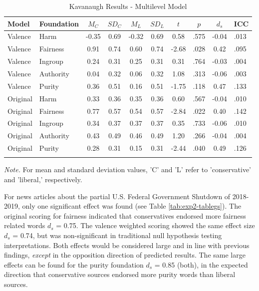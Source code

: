 \documentclass[
  man,floatsintext]{apa6}
\begin{document}
\begin{table}[ht]

\begin{center}
\begin{threeparttable}

\caption{\label{tab:exp2-tablekav}Kavanaugh Results - Multilevel Model}

\footnotesize{

\begin{tabular}{llcccccccl}
\toprule
Model & Foundation & $M_C$ & $SD_C$ & $M_L$ & $SD_L$ & $t$ & $p$ & $d_s$ & ICC\\
\midrule
Valence & Harm & -0.35 & 0.69 & -0.32 & 0.69 & 0.58 & .575 & -0.04 & .013\\
Valence & Fairness & 0.91 & 0.74 & 0.60 & 0.74 & -2.68 & .028 & 0.42 & .095\\
Valence & Ingroup & 0.24 & 0.31 & 0.25 & 0.31 & 0.31 & .764 & -0.03 & .004\\
Valence & Authority & 0.04 & 0.32 & 0.06 & 0.32 & 1.08 & .313 & -0.06 & .003\\
Valence & Purity & 0.36 & 0.51 & 0.16 & 0.51 & -1.75 & .118 & 0.47 & .133\\
Original & Harm & 0.33 & 0.36 & 0.35 & 0.36 & 0.60 & .567 & -0.04 & .010\\
Original & Fairness & 0.77 & 0.57 & 0.54 & 0.57 & -2.84 & .022 & 0.40 & .142\\
Original & Ingroup & 0.34 & 0.37 & 0.37 & 0.37 & 0.35 & .733 & -0.06 & .010\\
Original & Authority & 0.43 & 0.49 & 0.46 & 0.49 & 1.20 & .266 & -0.04 & .004\\
Original & Purity & 0.28 & 0.31 & 0.15 & 0.31 & -2.44 & .040 & 0.49 & .126\\
\bottomrule
\addlinespace
\end{tabular}

}

\begin{tablenotes}[para]
\normalsize{\textit{Note.} For mean and standard deviation values, 'C' and 'L' refer to 'conservative' and 'liberal,' respectively.}
\end{tablenotes}

\end{threeparttable}
\end{center}

\end{table}

For news articles about the partial U.S. Federal Government Shutdown of
2018-2019, only one significant effect was found (see Table \ref{tab:exp2-tablegs}). The original scoring for fairness indicated that conservatives endorsed more fairness related words \(d_s\) = 0.75. The valence weighted scoring showed the same effect size \(d_s\) = 0.74, but was non-significant in traditional null hypothesis testing interpretations. Both effects would be considered large and in line with previous findings, \emph{except} in the opposition direction of predicted results. The same large effects can be found for the purity foundation \(d_s\) = 0.85 (both), in the expected direction that conservative sources endorsed more purity words than liberal sources.
\end{document}
